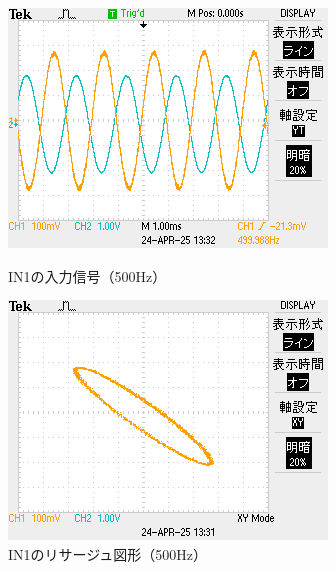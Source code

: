 \documentclass{jlreq}
\numberwithin{equation}{section}
\begin{document}
\begin{figure}[H]
  \centering
  \begin{minipage}{0.45\textwidth}
    \centering
    \includegraphics[width=\textwidth, keepaspectratio]{IN1_500Hz_YT.png}
    \caption{IN1の入力信号（500Hz）}
  \end{minipage}
  \hfill
  \begin{minipage}{0.45\textwidth}
    \centering
    \includegraphics[width=\textwidth, keepaspectratio]{IN1_500Hz_XY.png}
    \caption{IN1のリサージュ図形（500Hz）}
  \end{minipage}
\end{figure}
\end{document}
